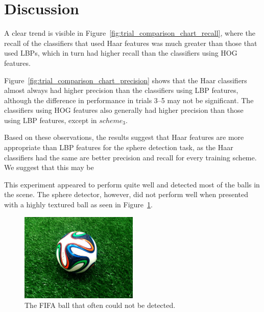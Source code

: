 \documentclass{llncs}
\begin{document}
	\section{Discussion} {


		A clear trend is visible in Figure~\ref{fig:trial_comparison_chart_recall}, where the recall of the classifiers that used Haar features was much greater than those that used LBPs, which in turn had higher recall than the classifiers using HOG features.

		Figure~\ref{fig:trial_comparison_chart_precision} shows that the Haar classifiers almost always had higher precision than the classifiers using LBP features, although the difference in performance in trials 3--5 may not be significant.
		The classifiers using HOG features also generally had higher precision than those using LBP features, except in \(scheme_3\).

		Based on these observations, the results suggest that Haar features are more appropriate than LBP features for the sphere detection task, as the Haar classifiers had the same are better precision and recall for every training scheme.
		We suggest that this may be 




		 This experiment appeared to perform quite well and detected most of the balls in the scene. The sphere detector, however, did not perform well when presented with a highly textured ball as seen in Figure~\ref{fig:fifa_ball}.

		\begin{figure}
			\centering
			\includegraphics[width=0.5\textwidth]{images/fifa_ball}
			\caption{The FIFA ball that often could not be detected.}
			\label{fig:fifa_ball}
		\end{figure}

}
\end{document}
